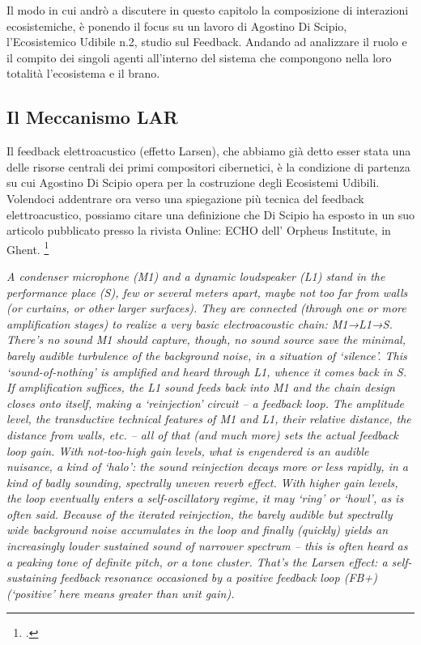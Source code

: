 Il modo in cui andrò a discutere in questo capitolo la composizione di interazioni ecosistemiche, 
è ponendo il focus su un lavoro di Agostino Di Scipio, l’Ecosistemico Udibile n.2, studio sul Feedback. 
Andando ad analizzare il ruolo e il compito dei singoli agenti all'interno del sistema 
che compongono nella loro totalità l'ecosistema e il brano. 

\subsection{Il Meccanismo LAR}
\label{sec:Il Meccanismo LAR}
Il feedback elettroacustico (effetto Larsen), che abbiamo già detto
esser stata una delle risorse centrali dei primi compositori cibernetici,
è la condizione di partenza su cui Agostino Di Scipio opera per la costruzione degli Ecosistemi Udibili.
Volendoci addentrare ora verso una spiegazione più tecnica del feedback elettroacustico,
possiamo citare una definizione che Di Scipio ha esposto in un suo articolo
pubblicato presso la rivista Online: ECHO dell’ Orpheus Institute, in
Ghent. \footcite{di_scipio_relational_2022}

\begin{center}
\vspace{0.5cm}
\textit{A condenser microphone (M1) and a dynamic loudspeaker (L1) stand in the performance place
(S), few or several meters apart, maybe not too far from walls (or curtains, or other larger
surfaces). They are connected (through one or more amplification stages) to realize a very
basic electroacoustic chain: M1→L1→S. There’s no sound M1 should capture, though, no sound
source save the minimal, barely audible turbulence of the background noise, in a situation of
‘silence’. This ‘sound-of-nothing’ is amplified and heard through L1, whence it comes back in
S. \\
If amplification suffices, the L1 sound feeds back into M1 and the chain design closes onto
itself, making a ‘reinjection’ circuit – a feedback loop. The amplitude level, the
transductive technical features of M1 and L1, their relative distance, the distance from
walls, etc. – all of that (and much more) sets the actual feedback loop gain. With
not-too-high gain levels, what is engendered is an audible nuisance, a kind of ‘halo’: the
sound reinjection decays more or less rapidly, in a kind of badly sounding, spectrally uneven
reverb effect. With higher gain levels, the loop eventually enters a self-oscillatory regime,
it may ‘ring’ or ‘howl’, as is often said. Because of the iterated reinjection, the barely
audible but spectrally wide background noise accumulates in the loop and finally (quickly)
yields an increasingly louder sustained sound of narrower spectrum – this is often heard as a
peaking tone of definite pitch, or a tone cluster. That’s the Larsen effect: a self-sustaining
feedback resonance occasioned by a positive feedback loop (FB+) (‘positive’ here means greater
than unit gain).}
\vspace{0.5cm}
\vspace{0.5cm}
\end{center}

